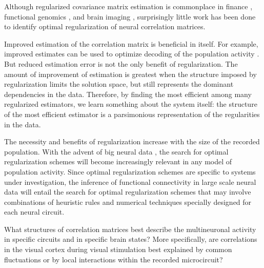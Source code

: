 \documentclass[10pt]{article}
\begin{document}
Although regularized covariance matrix estimation is commonplace in finance \cite{Ledoit:2003}, functional genomics \cite{Schafer:2005}, and brain imaging \cite{Ryali:2012}, surprisingly little work has been done to identify optimal regularization of neural correlation matrices. 

Improved estimation of the correlation matrix is beneficial in itself. For example, improved estimates can be used to optimize  decoding of the population activity \cite{Friedman:1989}. But reduced estimation error is not the only benefit of regularization.  The amount of improvement of estimation is greatest when the structure imposed by regularization limits the solution space, but still represents the dominant dependencies in the data. Therefore, by finding the most efficient among many regularized estimators, we learn something about the system itself: the structure of the most efficient estimator is a parsimonious representation of the regularities in the data. 

The necessity and benefits of regularization increase with the size of the recorded population. With the advent of  big neural data \cite{Alivasatos:2013}, the search for optimal regularization schemes will become increasingly relevant in any model of population activity. Since optimal regularization schemes are specific to systems under investigation, the inference of functional connectivity in large scale neural data will entail the search for optimal regularization schemes that may involve combinations of heuristic rules and numerical techniques specially designed for each neural circuit.

What structures of correlation matrices best describe the multineuronal activity in specific circuits and in specific brain states?  More specifically, are correlations in the visual cortex during visual stimulation best explained by common fluctuations or by local interactions within the recorded microcircuit? 
\end{document}
